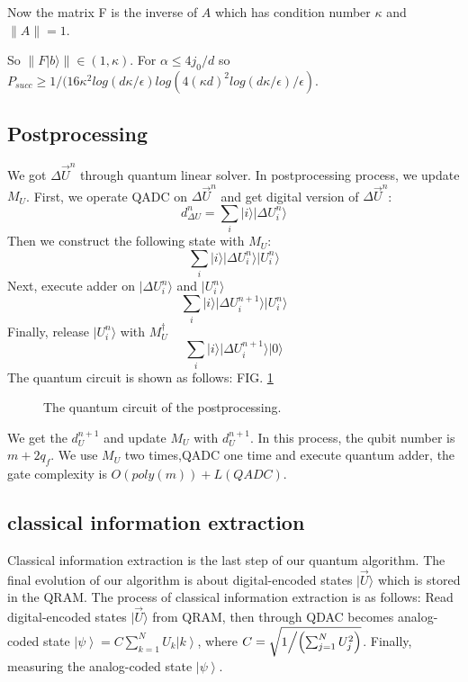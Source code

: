 \documentclass[%
 reprint,
 amsmath,amssymb,
pra,
]{revtex4-1}
\begin{document}
Now the matrix F is the inverse of $A$ 
which has condition number $\kappa$ and $\lVert A\rVert=1$. 

So $\lVert F|b\rangle\rVert\in (1, \kappa)$. For $\alpha\leqslant4j_0/d$ so
$P_{succ}\geqslant 1/(16\kappa^2 log(d\kappa/\epsilon) log(4(\kappa d)^2log(d
\kappa/\epsilon)/\epsilon)$. 


\subsection{Postprocessing}

We got $\Delta \vec{U}^n$ through quantum linear solver. In postprocessing process, we update $M_U$. First, we operate QADC on $\Delta \vec{U}^n$ and get digital version of $\Delta \vec{U}^n$:
$$
d_{\Delta U}^n=\sum_i{|i\rangle|\Delta U_i^n\rangle}
$$
Then we construct the following state with $M_U$:
$$
\sum_i{|i\rangle|\Delta U_i^n\rangle|U_i^n\rangle}
$$
Next, execute adder on $|\Delta U_i^n\rangle$ and $|U_i^n\rangle$
$$
\sum_i{|i\rangle|\Delta U_i^{n+1}\rangle|U_i^n\rangle}
$$
Finally, release $|U_i^n\rangle$ with $M_U^{\dagger}$
$$
\sum_i{|i\rangle|\Delta U_i^{n+1}\rangle|0\rangle}
$$
The quantum circuit is shown as follows: FIG. \ref{postprocessing_qcir}
\begin{figure}[htbp]
	 \caption{The quantum circuit of the postprocessing.}
	\label{postprocessing_qcir}
   \end{figure}
We get the $d_U^{n+1}$ and update $M_U$ with $d_U^{n+1}$. In this process, the qubit number is $m+2q_f$. We use $M_U$ two times,QADC one time and execute quantum adder, the gate complexity is $O(poly(m))+L(QADC)$.


\subsection{classical information extraction}
Classical information extraction is the last step of our quantum algorithm. 
The final evolution of our algorithm is about digital-encoded states
$|\vec{U}\rangle$ which is stored in the QRAM. 
The process of classical information extraction is as follows: 
Read digital-encoded states $|\vec{U}\rangle$ from QRAM, 
then through QDAC becomes analog-coded state $\left| \psi  \right\rangle  = C\sum\limits_{k = 1}^N {{U_k}\left| k \right\rangle } $,
where $C = \sqrt {{1 \mathord{\left/
{\vphantom {1 {\left( {\sum\nolimits_{j = 1}^N {U_j^2} } \right)}}} \right.
\kern-\nulldelimiterspace} {\left( {\sum\nolimits_{j = 1}^N {U_j^2} } \right)}}} $.
Finally, measuring the analog-coded state $\left| \psi  \right\rangle $.
\end{document}
